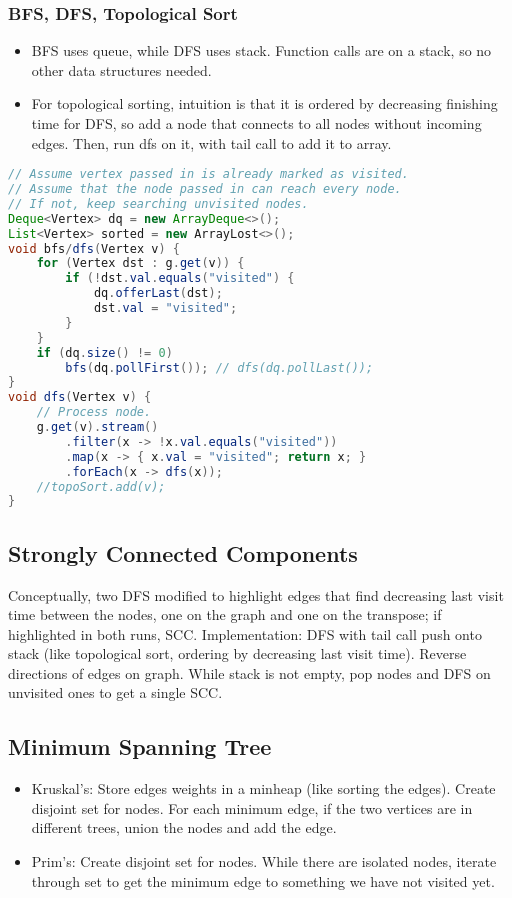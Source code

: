 \documentclass[10pt]{article}
\begin{document}
\subsubsection{BFS, DFS, Topological Sort}
\begin{itemize}
    \item BFS uses queue, while DFS uses stack. Function calls are on a stack, so no other data structures needed.
    \item For topological sorting, intuition is that it is ordered by decreasing finishing time for DFS, so add a node that connects to all nodes without incoming edges. Then, run dfs on it, with tail call to add it to array.
\end{itemize}
\begin{lstlisting}[language=java]
// Assume vertex passed in is already marked as visited.
// Assume that the node passed in can reach every node.
// If not, keep searching unvisited nodes.
Deque<Vertex> dq = new ArrayDeque<>();
List<Vertex> sorted = new ArrayLost<>();
void bfs/dfs(Vertex v) {
    for (Vertex dst : g.get(v)) {
        if (!dst.val.equals("visited") {
            dq.offerLast(dst);
            dst.val = "visited";
        }
    }
    if (dq.size() != 0)
        bfs(dq.pollFirst()); // dfs(dq.pollLast());
}
void dfs(Vertex v) {
    // Process node.
    g.get(v).stream()
        .filter(x -> !x.val.equals("visited"))
        .map(x -> { x.val = "visited"; return x; }
        .forEach(x -> dfs(x));
    //topoSort.add(v);
}
\end{lstlisting}
\subsection{Strongly Connected Components}
Conceptually, two DFS modified to highlight edges that find decreasing last visit time between the nodes, one on the graph and one on the transpose; if highlighted in both runs, SCC. Implementation: DFS with tail call push onto stack (like topological sort, ordering by decreasing last visit time). Reverse directions of edges on graph. While stack is not empty, pop nodes and DFS on unvisited ones to get a single SCC. 
\subsection{Minimum Spanning Tree}
\begin{itemize}
    \itemsep0em
    \item Kruskal's: Store edges weights in a minheap (like sorting the edges). Create disjoint set for nodes. For each minimum edge, if the two vertices are in different trees, union the nodes and add the edge.
    \item Prim's: Create disjoint set for nodes. While there are isolated nodes, iterate through set to get the minimum edge to something we have not visited yet.
\end{itemize}
\end{document}
